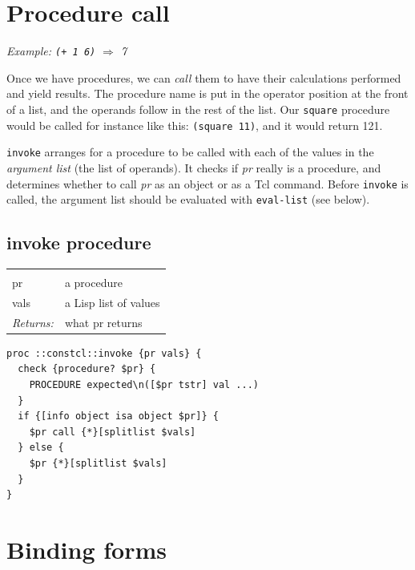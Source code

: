 \documentclass[twoside]{report}
\begin{document}
\section{Procedure call}
\label{procedure-call}

\emph{Example: \texttt{(+ 1 6)} $\Rightarrow$ 7}

Once we have procedures, we can \emph{call} them to have their calculations performed and yield results. The procedure name is put in the operator position at the front of a list, and the operands follow in the rest of the list. Our \texttt{square} procedure would be called for instance like this: \texttt{(square 11)}, and it would return 121.

\texttt{invoke} arranges for a procedure to be called with each of the values in the \emph{argument list} (the list of operands). It checks if \emph{pr} really is a procedure, and determines whether to call \emph{pr} as an object or as a Tcl command. Before \texttt{invoke} is called, the argument list should be evaluated with \texttt{eval-list} (see below).

\subsection{invoke procedure}
\label{invoke-procedure}

\noindent\begin{tabular}{ |p{1.9cm} p{8cm}| }
\hline
\rowcolor[HTML]{CCCCCC} \multicolumn{2}{|l|}{\bf invoke (internal)} \\
pr & a procedure \\
vals & a Lisp list of values \\
\textit{Returns:} & what pr returns \\
\hline
\end{tabular}

\begin{lstlisting}
proc ::constcl::invoke {pr vals} {
  check {procedure? $pr} {
    PROCEDURE expected\n([$pr tstr] val ...)
  }
  if {[info object isa object $pr]} {
    $pr call {*}[splitlist $vals]
  } else {
    $pr {*}[splitlist $vals]
  }
}
\end{lstlisting}

\section{Binding forms}
\label{binding-forms}
\end{document}
